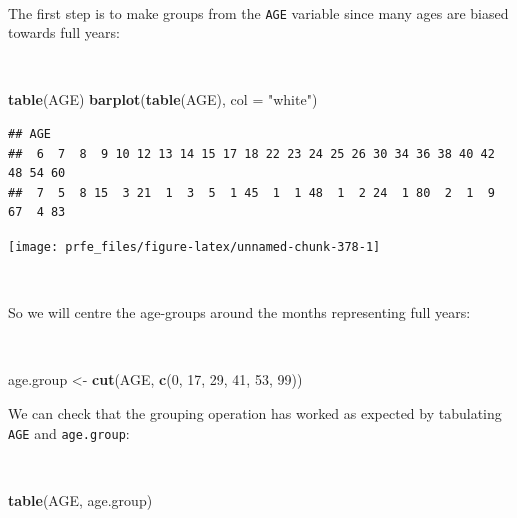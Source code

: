 \documentclass[12pt,a4paper]{book}
\newenvironment{Shaded}{\begin{snugshade}}{\end{snugshade}}
\newcommand{\DataTypeTok}[1]{\textcolor[rgb]{0.13,0.29,0.53}{#1}}
\newcommand{\DecValTok}[1]{\textcolor[rgb]{0.00,0.00,0.81}{#1}}
\newcommand{\KeywordTok}[1]{\textcolor[rgb]{0.13,0.29,0.53}{\textbf{#1}}}
\newcommand{\NormalTok}[1]{#1}
\newcommand{\StringTok}[1]{\textcolor[rgb]{0.31,0.60,0.02}{#1}}
\theoremstyle{definition}
\theoremstyle{definition}
\theoremstyle{definition}
\theoremstyle{remark}
\begin{document}
~

The first step is to make groups from the \texttt{AGE} variable since
many ages are biased towards full years:

~

\begin{Shaded}
\begin{Highlighting}[]
\KeywordTok{table}\NormalTok{(AGE)}
\KeywordTok{barplot}\NormalTok{(}\KeywordTok{table}\NormalTok{(AGE), }\DataTypeTok{col =} \StringTok{"white"}\NormalTok{)}
\end{Highlighting}
\end{Shaded}

\begin{verbatim}
## AGE
##  6  7  8  9 10 12 13 14 15 17 18 22 23 24 25 26 30 34 36 38 40 42 48 54 60 
##  7  5  8 15  3 21  1  3  5  1 45  1  1 48  1  2 24  1 80  2  1  9 67  4 83
\end{verbatim}

\begin{center}\texttt{[image: prfe\_files/figure-latex/unnamed-chunk-378-1]} \end{center}

~

So we will centre the age-groups around the months representing full
years:

~

\begin{Shaded}
\begin{Highlighting}[]
\NormalTok{age.group <-}\StringTok{ }\KeywordTok{cut}\NormalTok{(AGE, }\KeywordTok{c}\NormalTok{(}\DecValTok{0}\NormalTok{, }\DecValTok{17}\NormalTok{, }\DecValTok{29}\NormalTok{, }\DecValTok{41}\NormalTok{, }\DecValTok{53}\NormalTok{, }\DecValTok{99}\NormalTok{))}
\end{Highlighting}
\end{Shaded}

\newpage

We can check that the grouping operation has worked as expected by
tabulating \texttt{AGE} and \texttt{age.group}:

~

\begin{Shaded}
\begin{Highlighting}[]
\KeywordTok{table}\NormalTok{(AGE, age.group)}
\end{Highlighting}
\end{Shaded}
\end{document}
